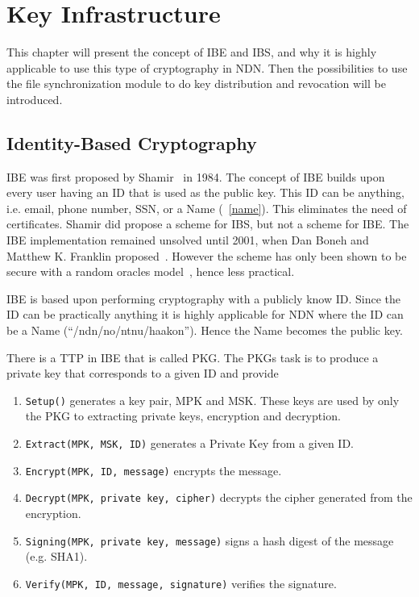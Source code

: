 \chapter{Key Infrastructure}
This chapter will present the concept of \gls{IBE} and \gls{IBS}, and why it is highly applicable to use this type of cryptography in \gls{NDN}. 
Then the possibilities to use the file synchronization module to do key distribution and revocation will be introduced.

\section{Identity-Based Cryptography}\label{ibc}
\gls{IBE} was first proposed by Shamir~\cite{DBLP:conf/crypto/Shamir84} in 1984. 
The concept of \gls{IBE} builds upon every user having an \gls{ID} that is used as the public key. 
This \gls{ID} can be anything, i.e. email, phone number, \gls{SSN}, or a Name (~\autoref{name}).
This eliminates the need of certificates.
Shamir did propose a scheme for \gls{IBS}, but not a scheme for \gls{IBE}. 
The \gls{IBE} implementation remained unsolved until 2001, when Dan Boneh and Matthew K. Franklin proposed~\cite{DBLP:conf/crypto/BonehF01}.
However the scheme has only been shown to be secure with a random oracles model~\cite{DBLP:journals/iacr/Waters04}, hence less practical.


\gls{IBE} is based upon performing cryptography with a publicly know \gls{ID}.
Since the \gls{ID} can be practically anything it is highly applicable for \gls{NDN} where the \gls{ID} can be a Name (``/ndn/no/ntnu/haakon'').
Hence the Name becomes the public key. 

There is a \gls{TTP} in \gls{IBE} that is called \gls{PKG}.
The \gls{PKG}s task is to produce a private key that corresponds to a given ID and provide 

\begin{enumerate}\label{ibc-methods}
  \item \texttt{Setup()} generates a key pair, \gls{MPK} and \gls{MSK}. These keys are used by only the \gls{PKG} to extracting private keys, encryption and decryption.
  \item \texttt{Extract(MPK, MSK, ID)} generates a Private Key from a given ID. 
  \item \texttt{Encrypt(MPK, ID, message)} encrypts the message.
  \item \texttt{Decrypt(MPK, private key, cipher)} decrypts the cipher generated from the encryption.
  \item \texttt{Signing(MPK, private key, message)} signs a hash digest of the message (e.g. \gls{SHA1}).
  \item \texttt{Verify(MPK, ID, message, signature)} verifies the signature.
\end{enumerate}

